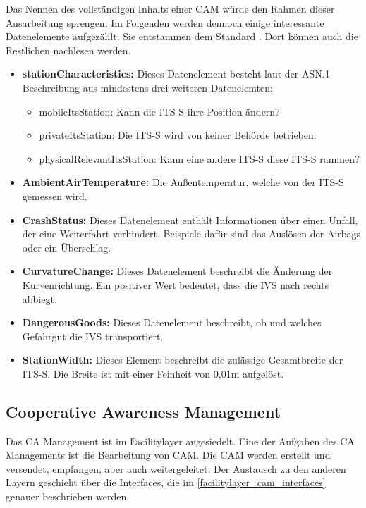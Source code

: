 Das Nennen des vollständigen Inhalts einer \ac{CAM} würde den Rahmen dieser Ausarbeitung sprengen. Im Folgenden werden dennoch einige interessante Datenelemente aufgezählt. Sie entstammen dem Standard \cite{ts102637-2}. Dort können auch die Restlichen nachlesen werden.

\begin{itemize}
	\item \textbf{stationCharacteristics: } Dieses Datenelement besteht laut der \ac{ASN.1} Beschreibung aus mindestens drei weiteren Datenelemten:
	\begin{itemize}
		\item mobileItsStation: Kann die \ac{ITS-S} ihre Position ändern?
		\item privateItsStation: Die \ac{ITS-S} wird von keiner Behörde betrieben.
		\item physicalRelevantItsStation: Kann eine andere \ac{ITS-S} diese \ac{ITS-S} rammen?
	\end{itemize}
	\item \textbf{AmbientAirTemperature: } Die Außentemperatur,  welche von der \ac{ITS-S} gemessen wird.
	\item \textbf{CrashStatus: } Dieses Datenelement enthält Informationen über einen Unfall, der eine Weiterfahrt verhindert. Beispiele dafür sind das Auslösen der Airbags oder ein Überschlag.
	\item \textbf{CurvatureChange: } Dieses Datenelement beschreibt die Änderung der Kurvenrichtung. Ein positiver Wert bedeutet, dass die \ac{IVS} nach rechts abbiegt.
	\item  \textbf{DangerousGoods: } Dieses Datenelement beschreibt, ob und welches Gefahrgut  die \ac{IVS} transportiert.
	\item \textbf{StationWidth: } Dieses Element beschreibt die zulässige Gesamtbreite der \ac{ITS-S}. Die Breite ist mit einer Feinheit von 0,01m aufgelöst.
\end{itemize}

\subsection{Cooperative Awareness Management}
Das \ac{CA} Management ist im Facilitylayer angesiedelt. Eine der Aufgaben des \ac{CA} Managements ist die Bearbeitung von \ac{CAM}. Die \ac{CAM} werden erstellt und versendet, empfangen, aber auch weitergeleitet. Der Austausch zu den anderen Layern geschieht über die Interfaces, die im \autoref{facilitylayer_cam_interfaces} genauer beschrieben werden.  

